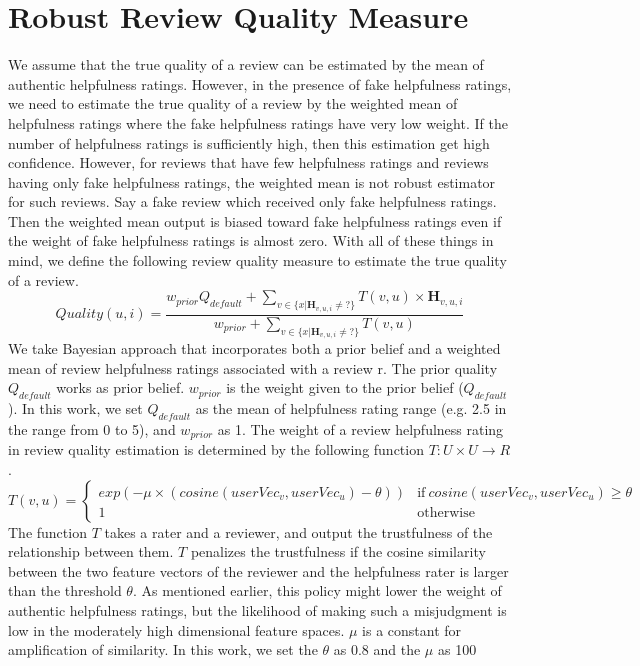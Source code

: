 \documentclass[master,english,final]{kaist-ucs}
\begin{document}
\section{Robust Review Quality Measure}
We assume that the true quality of a review can be estimated by the mean of authentic helpfulness ratings.
However, in the presence of fake helpfulness ratings, we need to estimate the true quality of a review by the weighted mean of helpfulness ratings where the fake helpfulness ratings have very low weight.
If the number of helpfulness ratings is sufficiently high, then this estimation get high confidence.
However, for reviews that have few helpfulness ratings and reviews having only fake helpfulness ratings, the weighted mean is not robust estimator for such reviews.
Say a fake review which received only fake helpfulness ratings.
Then the weighted mean output is biased toward fake helpfulness ratings even if the weight of fake helpfulness ratings is almost zero.
With all of these things in mind, we define the following review quality measure to estimate the true quality of a review.
\begin{equation}
Quality(u,i) = \frac{ w_{prior} Q_{default} + \sum_{v \in \{x|\bm{H}_{v,u,i} \neq ?\}} T(v,u) \times \bm{H}_{v,u,i} } {w_{prior}  + \sum_{v \in \{x|\bm{H}_{v,u,i} \neq ?\}} T(v,u) }
\end{equation}
We take Bayesian approach that incorporates both a prior belief and a weighted mean of review helpfulness ratings associated with a review r.
The prior quality $Q_{default}$ works as prior belief. $w_{prior}$ is the weight given to the prior belief ($Q_{default}$).
In this work, we set $Q_{default}$ as the mean of helpfulness rating range (e.g. 2.5 in the range from 0 to 5), and $w_{prior}$ as 1.
The weight of a review helpfulness rating in review quality estimation is determined by the following function $T: U \times U \rightarrow R$.
\begin{equation}
T(v,u)=
\begin{cases}
  exp(-\mu \times(cosine(userVec_v,userVec_u)-\theta)) & \text{if}\ cosine(userVec_v,userVec_u) \geq \theta \\
  1 & \text{otherwise}
\end{cases}
\end{equation}
The function $T$ takes a rater and a reviewer, and output the trustfulness of the relationship between them.
$T$ penalizes the trustfulness if the cosine similarity between the two feature vectors of the reviewer and the helpfulness rater is larger than the threshold $\theta$.
As mentioned earlier, this policy might lower the weight of authentic helpfulness ratings, but the likelihood of making such a misjudgment is low in the moderately high dimensional feature spaces.
$\mu$ is a constant for amplification of similarity.
In this work, we set the $\theta$ as 0.8 and the $\mu$ as 100
\end{document}
